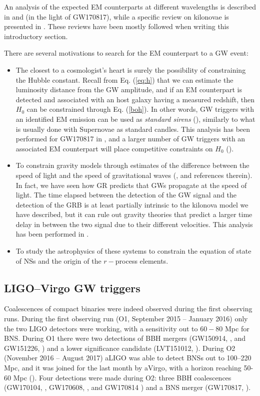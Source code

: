 An analysis of the expected EM counterparts at different wavelengths is described in \citet{EMreview} and \citet{Metzger17} (in the light of GW170817), while a specific review on kilonovae is presented in \citet{Metzger}. These reviews have been mostly followed when writing this introductory section.

There are several motivations to search for the EM counterpart to a GW event:
\begin{itemize}
\item The closest to a cosmologist's heart is surely the possibility of constraining the Hubble constant. Recall from Eq. (\ref{eq:h}) that we can estimate the luminosity distance from the GW amplitude, and if an EM counterpart is detected and associated with an host galaxy having a measured redshift, then $H_0$ can be constrained through Eq. (\ref{boh}). In other words, GW triggers with an identified EM emission can be used as \emph{standard sirens} (\citealt{Schutz86,Holz05}), similarly to what is usually done with Supernovae as standard candles. This analysis has been performed for GW170817 in \citet{gw170817h0}, and a larger number of GW triggers with an associated EM counterpart will place competitive constraints on $H_0$ (\citealt{Nissanke+10}).
\item To constrain gravity models through estimates of the difference between the speed of light and the speed of gravitational waves (\citealt{Nishizawa16}, \citealt{2017PhRvD..95f3512B} and references therein). In fact, we have seen how GR predicts that GWs propagate at the speed of light. The time elapsed between the detection of the GW signal and the detection of the GRB is at least partially intrinsic to the kilonova model we have described, but it can rule out gravity theories that predict a larger time delay in between the two signal due to their different velocities. This analysis has been performed in \citet{gwspeed}.
\item To study the astrophysics of these systems to constrain the equation of state of NSs and the origin of the $r-$process elements.
\end{itemize}

\subsection{LIGO--Virgo GW triggers}

Coalescences of compact binaries were indeed observed during the first observing runs. 
During the first observing run (O1, September 2015 -- January 2016) only the two LIGO detectors were working, with a sensitivity out to $60-80$ Mpc for BNS. During O1 there were two detections of BBH mergers (GW150914, \citealt{ligogw150914}, and GW151226, \citealt{GW151226}) and a lower significance candidate (LVT151012, \citealt{lvc}).
During O2 (November 2016 -- August 2017) aLIGO was able to detect BNSs out to 100--220 Mpc, and it was joined for the last month by aVirgo, with a horizon reaching 50-60 Mpc (\citealt{ligobns}). Four detections were made during O2: three BBH coalescences (GW170104, \citealt{GW170104}, GW170608, \citealt{GW170608}, and GW170814 \citealt{GW170814}) and a BNS merger (GW170817, \citealt{ligobns}).

